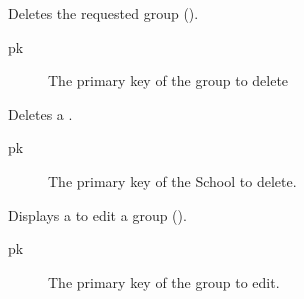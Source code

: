\documentclass[letterpaper,10pt,english]{sphinxmanual}
\begin{document}

\begin{fulllineitems}
\label{\detokenize{modules/views:users.views.deleteGroup}}
Deletes the requested group ().
\begin{description}
\item[{pk}] \leavevmode
The primary key of the group to delete

\end{description}

\end{fulllineitems}


\begin{fulllineitems}
\label{\detokenize{modules/views:users.views.deleteSchool}}
Deletes a {\hyperref[\detokenize{modules/models:users.models.School}]{}}.
\begin{description}
\item[{pk}] \leavevmode
The primary key of the School to delete.

\end{description}

\end{fulllineitems}


\begin{fulllineitems}
\label{\detokenize{modules/views:users.views.editGroup}}
Displays a {\hyperref[\detokenize{modules/forms:users.forms.EditGroupForm}]{}} to edit a group ().
\begin{description}
\item[{pk}] \leavevmode
The primary key of the group to edit.

\end{description}

\end{fulllineitems}
\end{document}
